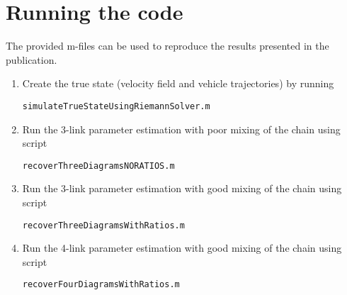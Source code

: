 \documentclass[english]{article}
\begin{document}
\section{Running the code}
The provided m-files can be used to reproduce the results presented in the publication.
\begin{enumerate}
\item Create the true state (velocity field and vehicle trajectories) by running
 \begin{verbatim}simulateTrueStateUsingRiemannSolver.m\end{verbatim}
 \item Run the 3-link parameter estimation with poor mixing of the chain using script
 \begin{verbatim}recoverThreeDiagramsNORATIOS.m\end{verbatim}
 \item Run the 3-link parameter estimation with good mixing of the chain using script
 \begin{verbatim}recoverThreeDiagramsWithRatios.m\end{verbatim}
 \item Run the 4-link parameter estimation with good mixing of the chain using script
 \begin{verbatim}recoverFourDiagramsWithRatios.m\end{verbatim}
\end{enumerate}
\end{document}
